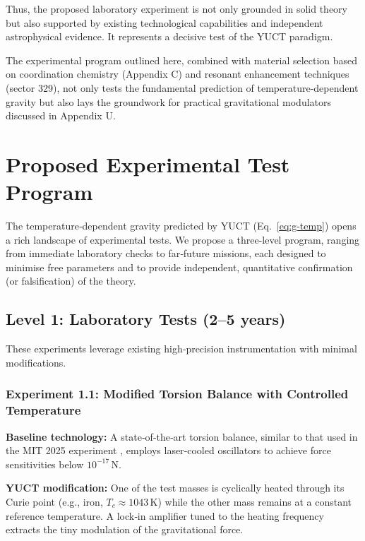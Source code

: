 \documentclass[12pt]{article}
\theoremstyle{remark}
\begin{document}
	Thus, the proposed laboratory experiment is not only grounded in solid theory but also supported by existing technological capabilities and independent astrophysical evidence. It represents a decisive test of the YUCT paradigm.
	
	The experimental program outlined here, combined with material selection based on coordination chemistry (Appendix C) and resonant enhancement techniques (sector 329), not only tests the fundamental prediction of temperature-dependent gravity but also lays the groundwork for practical gravitational modulators discussed in Appendix U.
	
	\section{Proposed Experimental Test Program}
	\label{sec:experiments}
	
	The temperature‑dependent gravity predicted by YUCT (Eq.~\ref{eq:g-temp}) opens a rich landscape of experimental tests.  
	We propose a three‑level program, ranging from immediate laboratory checks to far‑future missions, each designed to
	minimise free parameters and to provide independent, quantitative confirmation (or falsification) of the theory.
	
	\subsection{Level 1: Laboratory Tests (2–5 years)}
	\label{subsec:lab-tests}
	
	These experiments leverage existing high‑precision instrumentation with minimal modifications.
	
	\subsubsection{Experiment 1.1: Modified Torsion Balance with Controlled Temperature}
	
	\textbf{Baseline technology:} A state‑of‑the‑art torsion balance, similar to that used in the MIT 2025 experiment
	\cite{MIT2025}, employs laser‑cooled oscillators to achieve force sensitivities below \(10^{-17}\,\mathrm{N}\).
	
	\textbf{YUCT modification:} One of the test masses is cyclically heated through its Curie point (e.g., iron,
	\(T_c\approx1043\,\mathrm{K}\)) while the other mass remains at a constant reference temperature.  
	A lock‑in amplifier tuned to the heating frequency extracts the tiny modulation of the gravitational force.
	
\end{document}

